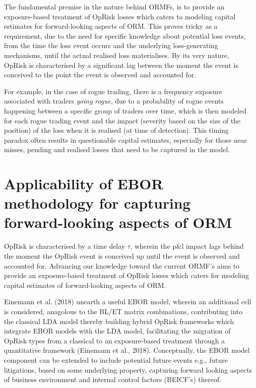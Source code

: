 \documentclass{DissertateUSU}
\begin{document}
The fundamental premise in the nature behind ORMFs, is to provide an
exposure-based treatment of OpRisk losses which caters to modeling
capital estimates for forward-looking aspects of ORM. This proves tricky
as a requirement, due to the need for specific knowledge about potential
loss events, from the time the loss event occurs and the underlying
loss-generating mechanisms, until the actual realised loss materialises.
By its very nature, OpRisk is characterised by a significant lag between
the moment the event is conceived to the point the event is observed and
accounted for.\medskip 

For example, in the case of rogue trading, there is a frequency exposure
associated with traders \emph{going rogue}, due to a probability of
rogue events happening between a specific group of traders over time,
which is then modeled for each rogue trading event and the impact
(severity based on the size of the position) of the loss when it is
realised (at time of detection). This timing paradox often results in
questionable capital estimates, especially for those near misses,
pending and realised losses that need to be captured in the model.

\section{Applicability of EBOR methodology for capturing forward-looking aspects of ORM}
\label{sec:Applicability of EBOR methodology for capturing forward-looking aspects of ORM}

OpRisk is characterised by a time delay \(\tau\), wherein the p\&l
impact lags behind the moment the OpRisk event is conceived up until the
event is observed and accounted for. Advancing our knowledge toward the
current ORMF's aims to provide an exposure-based treatment of OpRisk
losses which caters for modeling capital estimates of forward-looking
aspects of ORM.\medskip

Einemann et al. (2018) unearth a useful EBOR model, wherein an
additional cell is considered, anagolous to the BL/ET matrix
combinations, contributing into the classical LDA model thereby building
hybrid OpRisk frameworks which integrate EBOR models with the LDA model,
facilitating the migration of OpRisk types from a classical to an
exposure-based treatment through a quantitative framework (Einemann et
al., 2018). Conceptually, the EBOR model component can be extended to
include potential future events e.g., future litigations, based on some
underlying property, capturing forward looking aspects of business
environment and internal control factors (BEICF's) thereof.\medskip
\end{document}
